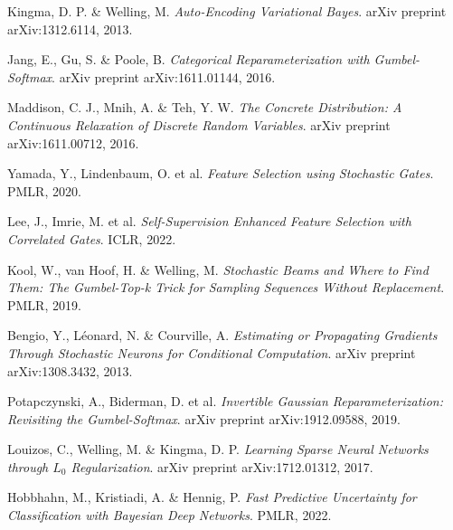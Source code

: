 \documentclass[peerreview]{IEEEtran}
\begin{document}
\begin{thebibliography}{1}

Kingma, D. P. \& Welling, M.
\emph{Auto-Encoding Variational Bayes}.
arXiv preprint arXiv:1312.6114, 2013.

Jang, E., Gu, S. \& Poole, B.
\emph{Categorical Reparameterization with Gumbel-Softmax}.
arXiv preprint arXiv:1611.01144, 2016.

Maddison, C. J., Mnih, A. \& Teh, Y. W.
\emph{The Concrete Distribution: A Continuous Relaxation of Discrete Random Variables}.
arXiv preprint arXiv:1611.00712, 2016.

Yamada, Y., Lindenbaum, O. et al.
\emph{Feature Selection using Stochastic Gates}.
PMLR, 2020.

Lee, J., Imrie, M. et al.
\emph{Self-Supervision Enhanced Feature Selection with Correlated Gates}.
ICLR, 2022.

Kool, W., van Hoof, H. \& Welling, M.
\emph{Stochastic Beams and Where to Find Them: The Gumbel-Top-k Trick for Sampling Sequences Without Replacement}.
PMLR, 2019.

Bengio, Y., Léonard, N. \& Courville, A.
\emph{Estimating or Propagating Gradients Through Stochastic Neurons for Conditional Computation}.
arXiv preprint arXiv:1308.3432, 2013.

Potapczynski, A., Biderman, D. et al.
\emph{Invertible Gaussian Reparameterization: Revisiting the Gumbel-Softmax}.
arXiv preprint arXiv:1912.09588, 2019.

Louizos, C., Welling, M. \& Kingma, D. P.
\emph{Learning Sparse Neural Networks through $L_0$ Regularization}.
arXiv preprint arXiv:1712.01312, 2017.

Hobbhahn, M., Kristiadi, A. \& Hennig, P.
\emph{Fast Predictive Uncertainty for Classification with Bayesian Deep Networks}.
PMLR, 2022.

\end{thebibliography}
\end{document}

